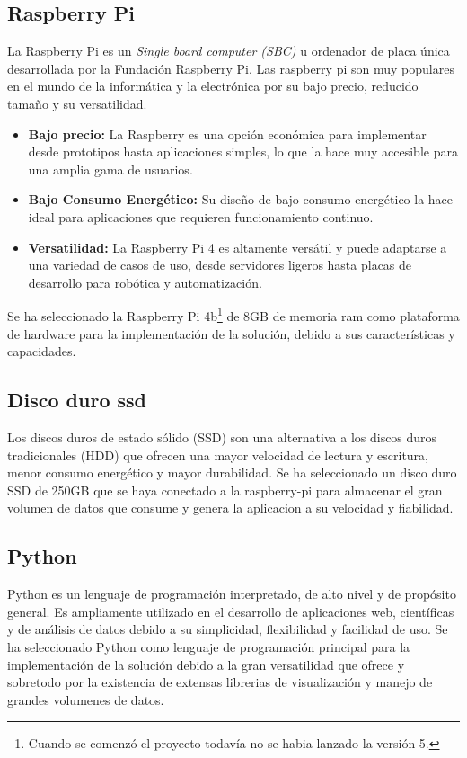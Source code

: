 \subsection{Raspberry Pi}

La Raspberry Pi es un \textit{Single board computer (SBC)} u ordenador de placa única desarrollada por la Fundación Raspberry Pi. Las raspberry pi son muy populares en el mundo de la informática y la electrónica por su bajo precio, reducido tamaño y su versatilidad.

\begin{itemize}
\item \textbf{Bajo precio:} La Raspberry es una opción económica para implementar desde prototipos hasta aplicaciones simples, lo que la hace muy accesible para una amplia gama de usuarios.
\item \textbf{Bajo Consumo Energético:} Su diseño de bajo consumo energético la hace ideal para aplicaciones que requieren funcionamiento continuo.
\item \textbf{Versatilidad:} La Raspberry Pi 4 es altamente versátil y puede adaptarse a una variedad de casos de uso, desde servidores ligeros hasta placas de desarrollo para robótica y automatización. 
\end{itemize}
Se ha seleccionado la Raspberry Pi 4b\footnote{Cuando se comenzó el proyecto todavía no se habia lanzado la versión 5.} de 8GB de memoria ram como plataforma de hardware para la implementación de la solución, debido a sus características y capacidades.

\subsection{Disco duro ssd}
Los discos duros de estado sólido (SSD) son una alternativa a los discos duros tradicionales (HDD) que ofrecen una mayor velocidad de lectura y escritura, menor consumo energético y mayor durabilidad. Se ha seleccionado un disco duro SSD de 250GB que se haya conectado a la raspberry-pi para almacenar el gran volumen de datos que consume y genera la aplicacion a su velocidad y fiabilidad.

\subsection{Python}
Python es un lenguaje de programación interpretado, de alto nivel y de propósito general. Es ampliamente utilizado en el desarrollo de aplicaciones web, científicas y de análisis de datos debido a su simplicidad, flexibilidad y facilidad de uso. Se ha seleccionado Python como lenguaje de programación principal para la implementación de la solución debido a la gran versatilidad que ofrece y sobretodo por la existencia de extensas librerias de visualización y manejo de grandes volumenes de datos.

